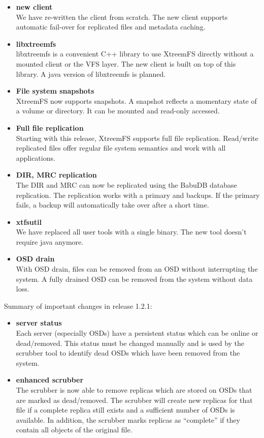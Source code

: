 \documentclass[a4paper,10pt]{book}
\begin{document}
\begin{itemize}
 \item \textbf{new client}\\
 We have re-written the client from scratch. The new client supports automatic fail-over for replicated files and metadata caching.
 \item \textbf{libxtreemfs}\\
 libxtreemfs is a convenient C++ library to use XtreemFS directly without a mounted client or the VFS layer. The new client is built on top of this library. A java version of libxtreemfs is planned.
 \item \textbf{File system snapshots}\\
 XtreemFS now supports snapshots. A snapshot reflects a momentary state of a volume or directory. It can be mounted and read-only accessed.
 \item \textbf{Full file replication}\\
 Starting with this release, XtreemFS supports full file replication. Read/write replicated files offer regular file system semantics and work with all applications.
 \item \textbf{DIR, MRC replication}\\
 The DIR and MRC can now be replicated using the BabuDB database replication. The replication works with a primary and backups. If the primary fails, a backup will automatically take over after a short time.
 \item \textbf{xtfsutil}\\
 We have replaced all user tools with a single binary. The new tool doesn't require java anymore.
 \item \textbf{OSD drain}\\
 With OSD drain, files can be removed from an OSD without interrupting the system. A fully drained OSD can be removed from the system without data loss.
\end{itemize}

Summary of important changes in release 1.2.1:

\begin{itemize}
 \item \textbf{server status}\\
 Each server (especially OSDs) have a persistent status which can be online or dead/removed. This status must be changed manually and is used by the scrubber tool to identify dead OSDs which have been removed from the system.
 \item \textbf{enhanced scrubber}\\
 The scrubber is now able to remove replicas which are stored on OSDs that are marked as dead/removed. The scrubber will create new replicas for that file if a complete replica still exists and a sufficient number of OSDs is available. In addition, the scrubber marks replicas as ``complete'' if they contain all objects of the original file.
\end{itemize}
\end{document}

